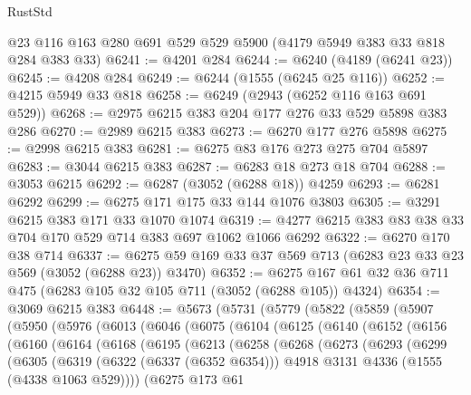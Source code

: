 \begin{lexlean}{RustStd}
\begin{coremodule}
    @23
    @116
    @163
    @280
    @691
    @529
    @529
    @5900
    (@4179 @5949 @383 @33 @818 @284 @383 @33)
@6241 := @4201 @284
@6244 := @6240 (@4189 (@6241 @23))
@6245 := @4208 @284
@6249 := @6244 (@1555 (@6245 @25 @116))
@6252 := @4215 @5949 @33 @818
@6258 := @6249 (@2943 (@6252 @116 @163 @691 @529))
@6268 := @2975 @6215 @383 @204 @177 @276 @33 @529 @5898 @383 @286
@6270 := @2989 @6215 @383
@6273 := @6270 @177 @276 @5898
@6275 := @2998 @6215 @383
@6281 := @6275 @83 @176 @273 @275 @704 @5897
@6283 := @3044 @6215 @383
@6287 := @6283 @18 @273 @18 @704
@6288 := @3053 @6215
@6292 := @6287 (@3052 (@6288 @18)) @4259
@6293 := @6281 @6292
@6299 := @6275 @171 @175 @33 @144 @1076 @3803
@6305 := @3291 @6215 @383 @171 @33 @1070 @1074
@6319 := @4277 @6215 @383 @83 @38 @33 @704 @170 @529 @714 @383 @697 @1062 @1066 @6292
@6322 := @6270 @170 @38 @714
@6337 := @6275 @59 @169 @33 @37 @569 @713 (@6283 @23 @33 @23 @569 (@3052 (@6288 @23)) @3470)
@6352 := @6275 @167 @61 @32 @36 @711 @475 (@6283 @105 @32 @105 @711 (@3052 (@6288 @105)) @4324)
@6354 := @3069 @6215 @383
@6448 := @5673
    (@5731
      (@5779
        (@5822
          (@5859
            (@5907
              (@5950
                (@5976
                  (@6013
                    (@6046
                      (@6075
                        (@6104
                          (@6125
                            (@6140
                              (@6152
                                (@6156
                                  (@6160
                                    (@6164
                                      (@6168
                                        (@6195
                                          (@6213
                                            (@6258
                                              (@6268
                                                (@6273
                                                  (@6293
                                                    (@6299
                                                      (@6305
                                                        (@6319
                                                          (@6322 (@6337 (@6352 @6354)))
                                                          @4918
                                                          @3131
                                                          @4336
                                                          (@1555 (@4338 @1063 @529))))
                                                      (@6275
                                                        @173
                                                        @61

\end{coremodule}
\end{lexlean}
